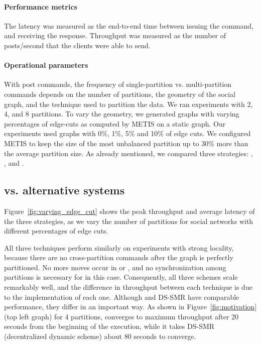 \paragraph*{Performance metrics}
%
The latency was measured as the end-to-end time between issuing the
command, and receiving the response.  Throughput was measured as the
number of posts/second that the clients were able to send.

\paragraph*{Operational parameters}
%
With post commands, the frequency of single-partition
vs. multi-partition commands depends on the number of partitions, the
geometry of the social graph, and the technique used to partition the
data. We ran experiments with 2, 4, and 8 partitions.  To vary the
geometry, we generated graphs with varying percentages of edge-cuts as
computed by METIS on a static graph. Our experiments used graphs with
0\%, 1\%, 5\% and 10\% of edge cuts. We configured METIS to keep the size of 
the most unbalanced partition up to 30\% more than the average partition size.
As already mentioned, we compared three strategies: \ssmr{}, \dssmr, and \dynastar.


\subsection{\dynastar vs. alternative systems}
\label{sec:evaluation:results}

Figure~\ref{fig:varying_edge_cut} shows the peak throughput and average latency of the three strategies, 
as we vary the number of partitions for social networks with different percentages of edge cuts.

All three techniques perform similarly on experiments with
strong locality, because there are no cross-partition commands after
the graph is perfectly partitioned. No more moves occur in
\dynastar or \dssmr, and no synchronization among partitions is
necessary for \ssmr in this case. 
Consequently, all three schemes scale remarkably well, and
the difference in throughput between each technique is due to the implementation of each one.
Although \dynastar and DS-SMR have comparable performance, they differ in an important way. 
As shown in Figure~\ref{fig:motivation} (top left graph) for 4 partitions, \dynastar converges 
to maximum throughput after 20 seconds from the beginning of the execution, while it takes 
DS-SMR (decentralized dynamic scheme) about 80 seconds to converge.


